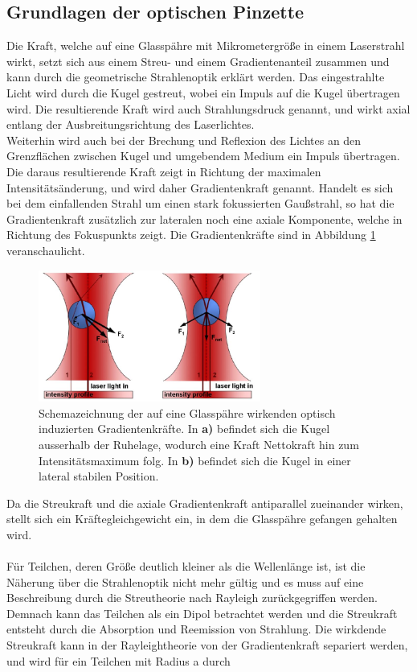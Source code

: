 \subsection{Grundlagen der optischen Pinzette}
\label{subsec:OptischePinzette}
Die Kraft, welche auf eine Glasspähre mit Mikrometergröße in einem Laserstrahl wirkt, setzt sich aus einem Streu- und einem Gradientenanteil zusammen und kann durch die geometrische Strahlenoptik erklärt werden.
Das eingestrahlte Licht wird durch die Kugel gestreut, wobei ein Impuls auf die Kugel übertragen wird. Die resultierende Kraft wird auch Strahlungsdruck genannt, und wirkt axial entlang der Ausbreitungsrichtung des Laserlichtes.\\
Weiterhin wird auch bei der Brechung und Reflexion des Lichtes an den Grenzflächen zwischen Kugel und umgebendem Medium ein Impuls übertragen. Die daraus resultierende Kraft zeigt in Richtung der maximalen Intensitätsänderung, und wird daher Gradientenkraft genannt. Handelt es sich bei dem einfallenden Strahl um einen stark fokussierten Gaußstrahl, so hat die Gradientenkraft zusätzlich zur lateralen noch eine axiale Komponente, welche in Richtung des Fokuspunkts zeigt. Die Gradientenkräfte sind in Abbildung \ref{fig:gradforce} veranschaulicht.
\begin{figure}[H]
  \centering
  \includegraphics[width=0.65\textwidth]{plots/gradientforce.jpg}
  \caption{Schemazeichnung der auf eine Glasspähre wirkenden optisch induzierten Gradientenkräfte. In \textbf{a)} befindet sich die Kugel ausserhalb der Ruhelage, wodurch eine Kraft Nettokraft hin zum Intensitätsmaximum folg. In \textbf{b)} befindet sich die Kugel in einer lateral stabilen Position. \cite{MIT}}
  \label{fig:gradforce}
\end{figure}
Da die Streukraft und die axiale Gradientenkraft antiparallel zueinander wirken, stellt sich ein Kräftegleichgewicht ein, in dem die Glasspähre gefangen gehalten wird.\\
\\
Für Teilchen, deren Größe deutlich kleiner als die Wellenlänge ist, ist die Näherung über die Strahlenoptik nicht mehr gültig und es muss auf eine Beschreibung durch die Streutheorie nach Rayleigh zurückgegriffen werden. Demnach kann das Teilchen als ein Dipol betrachtet werden und die Streukraft entsteht durch die Absorption und Reemission von Strahlung. Die wirkdende Streukraft kann in der Rayleightheorie von der Gradientenkraft separiert werden, und wird für ein Teilchen mit Radius a durch
